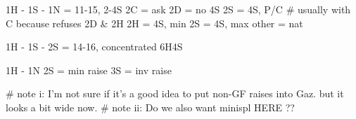 1H - 1S - 1N = 11-15, 2-4S
    2C = ask
        2D = no 4S
            2S = 4S, P/C  # usually with C because refuses 2D & 2H
        2H = 4S, min
        2S = 4S, max
    other = nat

1H - 1S - 2S = 14-16, concentrated 6H4S

1H - 1N
    2S = min raise
    3S = inv raise

# note i: I'm not sure if it's a good idea to put non-GF raises into Gaz. but it looks a bit wide now.
# note ii: Do we also want minispl HERE ??
